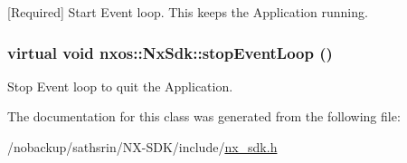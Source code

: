 \label{classnxos_1_1NxSdk_a75ca70643fe325ddf0eea62c1f8c4cc8}
\mbox{[}Required\mbox{]} Start Event loop. This keeps the Application running. \hypertarget{classnxos_1_1NxSdk_adc80e6f244a7cbc050f9dacbc8018315}{
\subsubsection[{stopEventLoop}]{\setlength{\rightskip}{0pt plus 5cm}virtual void nxos::NxSdk::stopEventLoop ()}}
\label{classnxos_1_1NxSdk_adc80e6f244a7cbc050f9dacbc8018315}
Stop Event loop to quit the Application. 

The documentation for this class was generated from the following file:\begin{DoxyCompactItemize}
\item 
/nobackup/sathsrin/NX-\/SDK/include/\hyperlink{nx__sdk_8h}{nx\_\-sdk.h}\end{DoxyCompactItemize}
